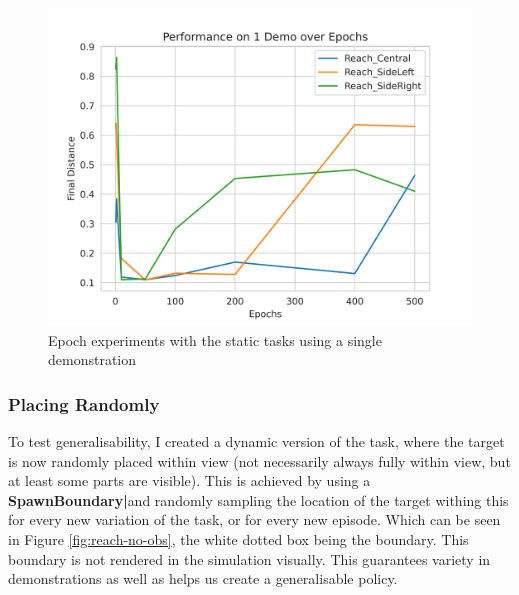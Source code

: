 \begin{figure}[htpb] %
  \centering
  \includegraphics[scale=0.5]{assets/cam-comb/reach-no-obs/rno_static.png}
  \caption{Epoch experiments with the static tasks using a single demonstration}\label{fig:rno-static}
\end{figure}

\subsubsection{Placing Randomly}
To test generalisability, I created a dynamic version of the task, where the target is now randomly placed within view (not necessarily always fully within view, but at least some parts are visible). This is achieved by using a \textbf{SpawnBoundary|}and randomly sampling the location of the target withing this for every new variation of the task, or for every new episode. Which can be seen in Figure \ref{fig:reach-no-obs}, the white dotted box being the boundary. This boundary is not rendered in the simulation visually. This guarantees variety in demonstrations as well as helps us create a generalisable policy.

